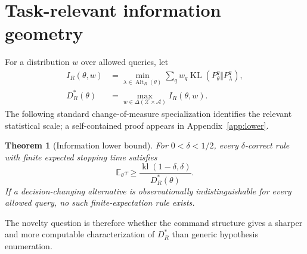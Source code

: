 \documentclass{article}
\newtheorem{theorem}{Theorem}
\newcommand{\KL}{\operatorname{KL}}
\newcommand{\kl}{\operatorname{kl}}
\newcommand{\E}{\mathbb E}
\newcommand{\Alt}{\operatorname{Alt}}
\begin{document}
\section{Task-relevant information geometry}
For a distribution $w$ over allowed queries, let
\begin{align}
I_R(\theta,w)&=\min_{\lambda\in\Alt_R(\theta)}\sum_qw_q\KL(P_\theta^q\Vert P_\lambda^q),\\
D_R^*(\theta)&=\max_{w\in\Delta(\mathcal X\times\mathcal A)}I_R(\theta,w). \label{eq:rate}
\end{align}
The following standard change-of-measure specialization identifies the relevant statistical scale; a self-contained proof appears in Appendix~\ref{app:lower}.
\begin{theorem}[Information lower bound]\label{thm:lower}
For $0<\delta<1/2$, every $\delta$-correct rule with finite expected stopping time satisfies
\begin{equation}
\E_\theta\tau\ge\frac{\kl(1-\delta,\delta)}{D_R^*(\theta)}. \label{eq:lower}
\end{equation}
If a decision-changing alternative is observationally indistinguishable for every allowed query, no such finite-expectation rule exists.
\end{theorem}
The novelty question is therefore whether the command structure gives a sharper and more computable characterization of $D_R^*$ than generic hypothesis enumeration.
\end{document}
